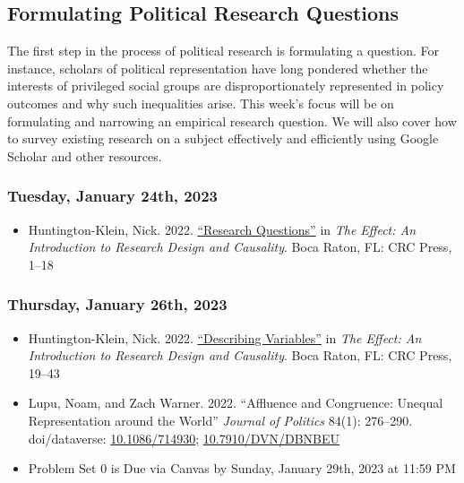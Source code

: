 \documentclass[12pt,]{article}
\providecommand{\tightlist}{%
  \setlength{\itemsep}{0pt}\setlength{\parskip}{0pt}}
\begin{document}
\hypertarget{formulating-political-research-questions}{%
\subsection{Formulating Political Research
Questions}\label{formulating-political-research-questions}}

\noindent The first step in the process of political research is
formulating a question. For instance, scholars of political
representation have long pondered whether the interests of privileged
social groups are disproportionately represented in policy outcomes and
why such inequalities arise. This week's focus will be on formulating
and narrowing an empirical research question. We will also cover how to
survey existing research on a subject effectively and efficiently using
Google Scholar and other resources.

\hypertarget{tuesday-january-24th-2023}{%
\subsubsection{Tuesday, January 24th,
2023}\label{tuesday-january-24th-2023}}

\begin{itemize}
\tightlist
\item
  Huntington-Klein, Nick. 2022.
  \href{https://theeffectbook.net/ch-ResearchQuestions.html}{``Research
  Questions''} in \emph{The Effect: An Introduction to Research Design
  and Causality}. Boca Raton, FL: CRC Press, 1--18
\end{itemize}

\hypertarget{thursday-january-26th-2023}{%
\subsubsection{Thursday, January 26th,
2023}\label{thursday-january-26th-2023}}

\begin{itemize}
\item
  Huntington-Klein, Nick. 2022.
  \href{https://theeffectbook.net/ch-DescribingVariables.html}{``Describing
  Variables''} in \emph{The Effect: An Introduction to Research Design
  and Causality}. Boca Raton, FL: CRC Press, 19--43
\item
  Lupu, Noam, and Zach Warner. 2022. ``Affluence and Congruence: Unequal
  Representation around the World'' \emph{Journal of Politics} 84(1):
  276--290. doi/dataverse:
  \href{https://doi.org/10.1086/714930}{10.1086/714930};
  \href{https://dataverse.harvard.edu/dataset.xhtml?persistentId=doi:10.7910/DVN/DBNBEU}{10.7910/DVN/DBNBEU}
\item
  Problem Set 0 is Due via Canvas by Sunday, January 29th, 2023 at 11:59
  PM
\end{itemize}
\end{document}

